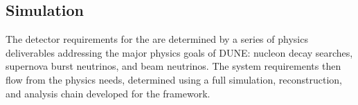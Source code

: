%
\subsection{Simulation}
\label{sec:fdsp-pd-simphys}


The detector requirements for the  are determined by a series of physics deliverables addressing the major physics goals of DUNE: nucleon decay searches, supernova burst neutrinos, and beam neutrinos. The system requirements then flow from the physics needs, determined using a full simulation, reconstruction, and analysis chain developed for the \larsoft framework. 


